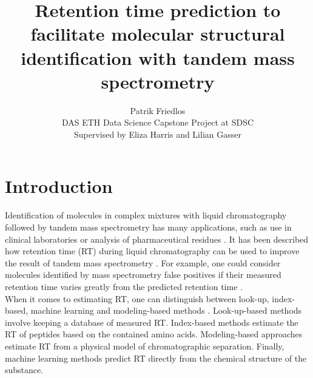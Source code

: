 \documentclass{article}
\title{Retention time prediction to facilitate molecular structural identification with tandem mass spectrometry}
\author{Patrik Friedlos\\
  \small DAS ETH Data Science Capstone Project at SDSC\\
  \small Supervised by Eliza Harris and Lilian Gasser
}
\theoremstyle{definition}
\theoremstyle{remark}
\begin{document}
\maketitle


\section{Introduction}

Identification of molecules in complex mixtures with liquid chromatography followed by tandem mass spectrometry has many applications, such as use in clinical laboratories or analysis of pharmaceutical residues \cite{van2012role, petrovic2005liquid}. It has been described how retention time (RT) during liquid chromatography can be used to improve the result of tandem mass spectrometry \cite{strittmatter2004application}. For example, one could consider molecules identified by mass spectrometry false positives if their measured retention time varies greatly from the predicted retention time \cite{yang2021prediction}.\\

When it comes to estimating RT, one can distinguish between look-up, index-based, machine learning and modeling-based methods \cite{moruz2017peptide}. Look-up-based methods involve keeping a database of measured RT. Index-based methods estimate the RT of peptides based on the contained amino acids. Modeling-based approaches estimate RT from a physical model of chromatographic separation. Finally, machine learning methods predict RT directly from the chemical structure of the substance.\\
\end{document}
